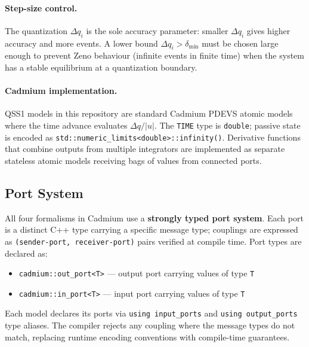 \paragraph{Step-size control.}
The quantization $\Delta q_i$ is the sole accuracy parameter: smaller
$\Delta q_i$ gives higher accuracy and more events.  A lower bound
$\Delta q_i > \delta_{\min}$ must be chosen large enough to prevent
Zeno behaviour (infinite events in finite time) when the system has a
stable equilibrium at a quantization boundary.

\paragraph{Cadmium implementation.}
QSS1 models in this repository are standard Cadmium PDEVS atomic models
where the time advance evaluates $\Delta q / \lvert u \rvert$.  The
\texttt{TIME} type is \texttt{double}; passive state is encoded as
\texttt{std::numeric\_limits<double>::infinity()}.  Derivative functions
that combine outputs from multiple integrators are implemented as separate
stateless atomic models receiving bags of values from connected ports.

\subsection*{Port System}

All four formalisms in Cadmium use a \textbf{strongly typed port system}.
Each port is a distinct C++ type carrying a specific message type;
couplings are expressed as \texttt{(sender-port, receiver-port)} pairs
verified at compile time.  Port types are declared as:

\begin{itemize}
  \item \texttt{cadmium::out\_port<T>} --- output port carrying values of type \texttt{T}
  \item \texttt{cadmium::in\_port<T>}  --- input port carrying values of type \texttt{T}
\end{itemize}

Each model declares its ports via \texttt{using input\_ports} and
\texttt{using output\_ports} type aliases.  The compiler rejects any
coupling where the message types do not match, replacing runtime
encoding conventions with compile-time guarantees.

